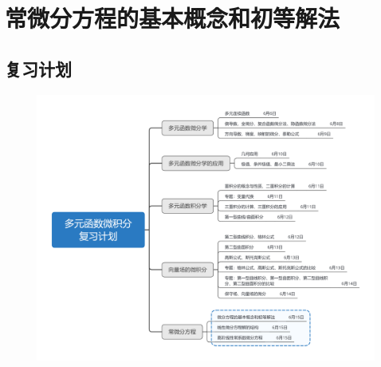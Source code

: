 \documentclass[12pt,UTF8,fleqn]{ctexart}
\begin{document}
\setcounter{section}{15}
\section{常微分方程的基本概念和初等解法}
\subsection{复习计划}
\begin{figure}[H]
\begin{center}
\includegraphics[height=0.5\textheight]{Figures20190615/plan.png}
\end{center}
\end{figure}
\end{document}
